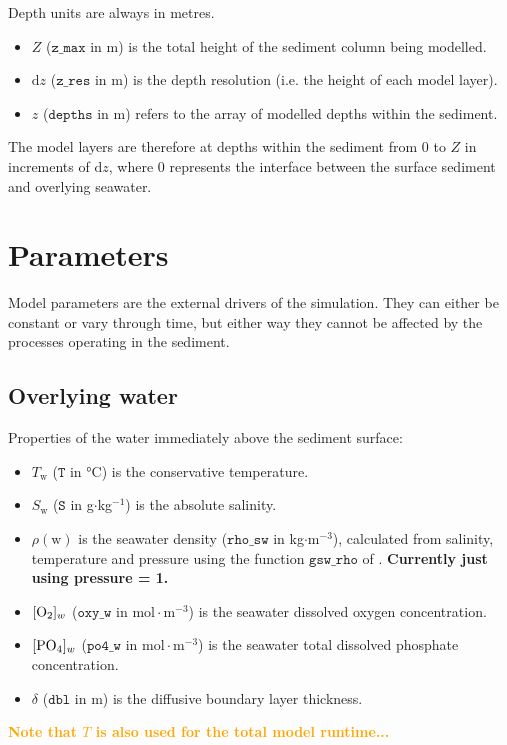 \documentclass[a4paper]{article}
\newcommand{\D}[1]{\mathrm{d}#1}
\newcommand{\code}[1]{\texttt{#1}}
\newcommand{\molmmm}{\mathrm{mol}\cdot\mathrm{m}^{-3}}
\newcommand{\degC}{\si{\degree}\mathrm{C}}
\newcommand{\wtf}[1]{\textcolor{Cerulean}{\textbf{#1}}}
\newcommand{\codenote}[1]{\textcolor{Orange}{\textbf{#1}}}
\begin{document}
Depth units are always in metres.
\begin{itemize}
  \item $Z$ ($\code{z\_max}$ in m) is the total height of the sediment column being modelled.
  \item $\D{z}$ ($\code{z\_res}$ in m) is the depth resolution (i.e. the height of each model layer).
  \item $z$ ($\code{depths}$ in m) refers to the array of modelled depths within the sediment.
\end{itemize}
The model layers are therefore at depths within the sediment from $0$ to $Z$ in increments of $\D{z}$, where $0$ represents the interface between the surface sediment and overlying seawater.



\section{Parameters}

Model parameters are the external drivers of the simulation.  They can either be constant or vary through time, but either way they cannot be affected by the processes operating in the sediment.


\subsection{Overlying water}

Properties of the water immediately above the sediment surface:

\begin{itemize}
  \item $T_\mathrm{w}$ ($\code{T}$ in $\degC$) is the conservative temperature.
  \item $S_\mathrm{w}$ ($\code{S}$ in g$\cdot$kg$^{-1}$) is the absolute salinity.
  \item $\rho(\mathrm{w})$ is the seawater density ($\code{rho\_sw}$ in kg$\cdot$m$^{-3}$), calculated from salinity, temperature and pressure using the function $\code{gsw\_rho}$ of \citet{mcdougall_getting_2011}.  \wtf{Currently just using pressure = 1.}
  \item $[\ce{O2}]_w$ ($\code{oxy\_w}$ in $\molmmm$) is the seawater dissolved oxygen concentration.
  \item $[\ce{PO4}]_w$ ($\code{po4\_w}$ in $\molmmm$) is the seawater total dissolved phosphate concentration.
  \item $\delta$ ($\code{dbl}$ in m) is the diffusive boundary layer thickness.
\end{itemize}
\codenote{Note that $T$ is also used for the total model runtime...}
\end{document}
